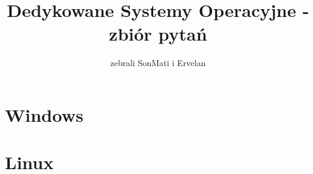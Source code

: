 \documentclass[a4paper,twoside]{article}
\newcommand{\Tak}[1] {
	\color{Gurin}{#1}
}
\newcommand{\Nie}[1] {
	\color{Red}{#1}
}
\newcommand{\question}[9] {
	\textbf{#1}
	\begin{enumerate}[a.]
		\ifnum\pdfstrcmp{#2}{Tak}=0
			\Tak{\item #3}
		\else
			\Nie{\item #3}
		\fi
		\color{black}
		\ifnum\pdfstrcmp{#4}{Tak}=0
			\Tak{\item #5}
		\else
			\Nie{\item #5}
		\fi
		\color{black}
		\ifnum\pdfstrcmp{#6}{Tak}=0
			\Tak{\item #7}
		\else
			\Nie{\item #7}
		\fi
		\color{black}
		\ifnum\pdfstrcmp{#8}{Tak}=0
			\Tak{\item #9}
		\else
			\Nie{\item #9}
		\fi
	\end{enumerate}
}
\begin{document}





\begin{titlepage}
\title{\huge Dedykowane Systemy Operacyjne - zbiór pytań}
\author{\large zebrali SonMati i Ervelan}
\maketitle
\end{titlepage}

\part{Windows}
	
	
	
	
		
	
	
	
	
	
	
	
	
\part{Linux}
	
	
	
	
	
	
	
	
	
	
	
	
\end{document}

